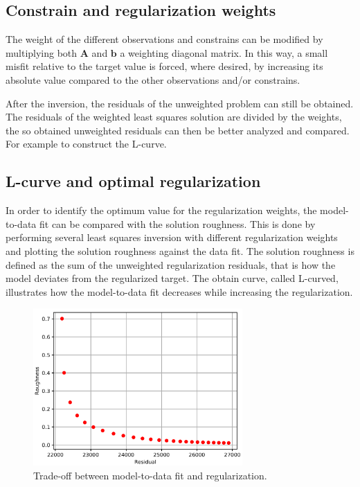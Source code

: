 \documentclass{article}
\begin{document}
\subsection{Constrain and regularization weights}

The weight of the different observations and constrains can be modified by multiplying both $\bm{A}$ and $\bm{b}$ a weighting diagonal matrix. In this way, a small misfit relative to the target value is forced, where desired, by increasing its absolute value compared to the other observations and/or constrains.

After the inversion, the residuals of the unweighted problem can still be obtained. The residuals of the weighted least squares solution are divided by the weights, the so obtained unweighted residuals can then be better analyzed and compared. For example to construct the L-curve.

\subsection{L-curve and optimal regularization}

In order to identify the optimum value for the regularization weights, the model-to-data fit can be compared with the solution roughness. This is done by performing several least squares inversion with different regularization weights and plotting the solution roughness against the data fit. The solution roughness is defined as the sum of the unweighted regularization residuals, that is how the model deviates from the regularized target. The obtain curve, called L-curved, illustrates how the model-to-data fit decreases while increasing the regularization.

\begin{figure}[H]
	\centering
	\captionsetup[sub]{margin=0.4cm}
	\includegraphics[width=8cm]{L_curve.png}
	\caption{Trade-off between model-to-data fit and regularization.\label{Lcurve}}
\end{figure}
\end{document}

